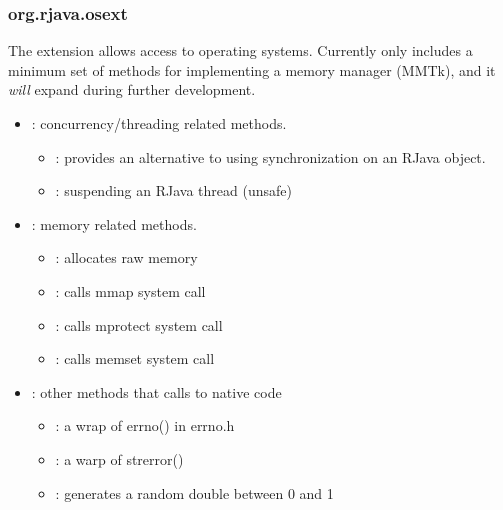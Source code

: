 \documentclass[12pt]{article}
\begin{document}
\subsubsection{org.rjava.osext}

The  extension allows access to operating systems. Currently
 only includes a minimum set of methods for implementing
a memory manager (MMTk), and it \emph{will} expand during further development. 

\begin{itemize}
\item
{}: concurrency/threading related methods. 
  \begin{itemize}
  \item {}: 
  provides an alternative to using synchronization on an RJava object. 
  \item {}:
  suspending an RJava thread (unsafe)
  \end{itemize}

\item
{}: memory related methods. 
  \begin{itemize}
  \item {}:
  allocates raw memory
  \item {}:
  calls mmap system call
  \item {}:
  calls mprotect system call
  \item {}:
  calls memset system call
  \end{itemize}

\item
{}: other methods that calls to native code
  \begin{itemize}
  \item {}: a wrap of errno() in errno.h
  \item {}: a warp of strerror()
  \item {}: generates a random double between 0 and 1
  \end{itemize}

\end{itemize}
\end{document}
